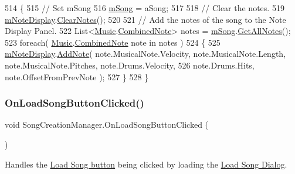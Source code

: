 \begin{DoxyCode}
514     \{
515         \textcolor{comment}{// Set mSong}
516         \hyperlink{group___s_c_m_priv_var_gabd8329149faef65a689650d951a9abc9}{mSong} = aSong;
517 
518         \textcolor{comment}{// Clear the notes.}
519         \hyperlink{group___s_c_m_priv_var_ga308f19d1b2020fc625c12dd08ee16b1c}{mNoteDisplay}.\hyperlink{group___s_c___n_d_c_pub_func_gaa344983500e83531210ae1c4789182f3}{ClearNotes}();
520 
521         \textcolor{comment}{// Add the notes of the song to the Note Display Panel.}
522         List<\hyperlink{class_music}{Music}.\hyperlink{group___music_structs_struct_music_1_1_combined_note}{CombinedNote}> notes = \hyperlink{group___s_c_m_priv_var_gabd8329149faef65a689650d951a9abc9}{mSong}.\hyperlink{group___song_pub_func_ga842675b7691fca074ee394031afc7675}{GetAllNotes}();
523         \textcolor{keywordflow}{foreach}( \hyperlink{class_music}{Music}.\hyperlink{group___music_structs_struct_music_1_1_combined_note}{CombinedNote} note in notes )
524         \{
525             \hyperlink{group___s_c_m_priv_var_ga308f19d1b2020fc625c12dd08ee16b1c}{mNoteDisplay}.\hyperlink{group___s_c___n_d_c_pub_func_ga43e58800daae0e46bbe1b86d78c2f677}{AddNote}( note.MusicalNote.Velocity, note.MusicalNote.Length, 
      note.MusicalNote.Pitches, note.Drums.Velocity,
526                 note.Drums.Hits, note.OffsetFromPrevNote );
527         \}
528     \}
\end{DoxyCode}
\mbox{\label{group___s_c_m_handlers_ga1747d021ddb36a8c2c172315d6fbb3a8}} 
\subsubsection{\texorpdfstring{On\+Load\+Song\+Button\+Clicked()}{OnLoadSongButtonClicked()}}
{\footnotesize\ttfamily void Song\+Creation\+Manager.\+On\+Load\+Song\+Button\+Clicked (\begin{DoxyParamCaption}{ }\end{DoxyParamCaption})\hspace{0.3cm}{\ttfamily [private]}}



Handles the \hyperlink{group___s_c_m_priv_var_ga7851ecd194d87e14fa186fc76e154222}{Load Song button} being clicked by loading the \hyperlink{group___doc_s_c___l_s_d}{Load Song Dialog}. 



